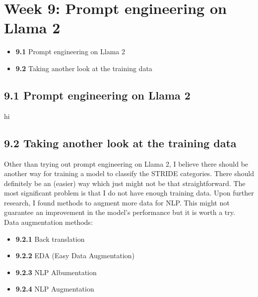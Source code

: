 \section*{Week 9: Prompt engineering on Llama 2}

\begin{itemize}
    \item \textbf{9.1} Prompt engineering on Llama 2
    \item \textbf{9.2} Taking another look at the training data
\end{itemize}

\subsection*{9.1 Prompt engineering on Llama 2}
hi

\subsection*{9.2 Taking another look at the training data}
Other than trying out prompt engineering on Llama 2, I believe there should be another way for training a model to classify the STRIDE categories.
There should definitely be an (easier) way which just might not be that straightforward.
The most significant problem is that I do not have enough training data. Upon further research, I found methods to augment more data for NLP. This might not guarantee an improvement in the model's performance but it is worth a try. \\
Data augmentation methods:
\begin{itemize}[topsep=0pt]
    \item \textbf{9.2.1} Back translation
    \item \textbf{9.2.2} EDA (Easy Data Augmentation)
    \item \textbf{9.2.3} NLP Albumentation
    \item \textbf{9.2.4} NLP Augmentation
\end{itemize}


